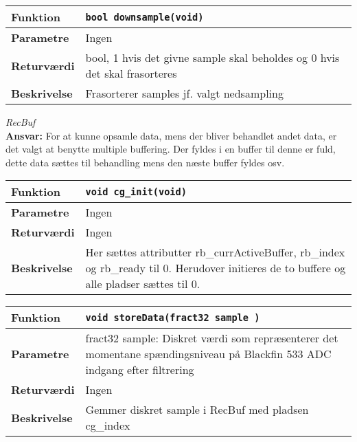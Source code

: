 \begin{center}
    \begin{tabular}{ | l | p{} |}
    \hline
    \textbf{Funktion}	& \verb+bool downsample(void) +						\\ \hline
    \textbf{Parametre} 	& Ingen		\\ \hline
    \textbf{Returværdi}	&  bool, 1 hvis det givne sample skal beholdes og 0 hvis det skal frasorteres 								\\ \hline
    \textbf{Beskrivelse}& Frasorterer samples jf. valgt nedsampling		\\ \hline
    \end{tabular}
\end{center}


\textit{RecBuf} \\
\textbf{Ansvar:} For at kunne opsamle data, mens der bliver behandlet andet data, er det valgt at benytte multiple buffering. Der fyldes i en buffer til denne er fuld, dette data sættes til behandling mens den næste buffer fyldes osv.

\begin{center}
    \begin{tabular}{ | l | p{} |}
    \hline
    \textbf{Funktion}	& \verb+void cg_init(void) +						\\ \hline
    \textbf{Parametre} 	& Ingen		\\ \hline
    \textbf{Returværdi}	& Ingen 								\\ \hline
    \textbf{Beskrivelse}& Her sættes attributter rb\_currActiveBuffer, rb\_index og rb\_ready til 0. Herudover initieres de to buffere og alle pladser sættes til 0. 		\\ \hline
    \end{tabular}
\end{center} 

\begin{center}
    \begin{tabular}{ | l | p{} |}
    \hline
    \textbf{Funktion}	& \verb+void storeData(fract32 sample ) +						\\ \hline
    \textbf{Parametre} 	& fract32 sample: Diskret værdi som repræsenterer det momentane spændingsniveau på Blackfin 533 ADC indgang efter filtrering	\\ \hline
    \textbf{Returværdi}	& Ingen 								\\ \hline
    \textbf{Beskrivelse}& Gemmer diskret sample i RecBuf med pladsen cg\_index		\\ \hline
    \end{tabular}
\end{center} 



